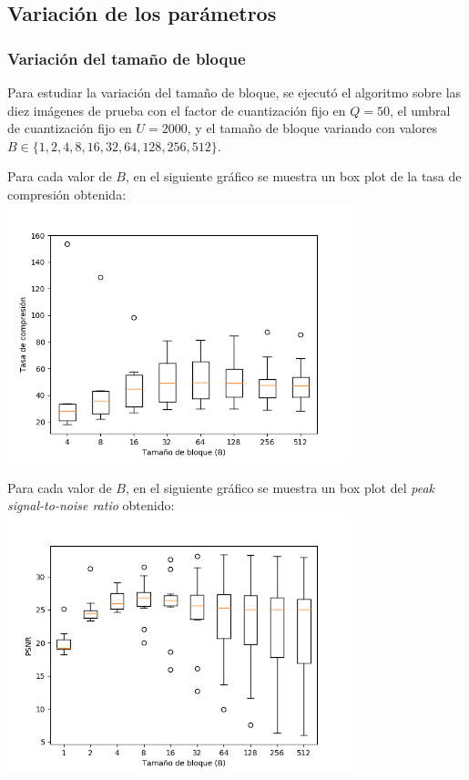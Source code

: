 \documentclass{article}
\newcommand{\set}[1]{\{#1\}}
\begin{document}
\newpage
\subsection{Variación de los parámetros}

\subsubsection{Variación del tamaño de bloque}

Para estudiar la variación del tamaño de bloque, se ejecutó el
algoritmo sobre las diez imágenes de prueba con el
factor de cuantización fijo en $Q = 50$,
el umbral de cuantización fijo en $U = 2000$,
y el tamaño de bloque variando con valores
$B \in \set{1,2,4,8,16,32,64,128,256,512}$.

Para cada valor de $B$, en el siguiente gráfico se muestra un
box plot de la tasa de compresión obtenida:\\
\includegraphics[width=10cm]{../imgs/output/gray_plots/b_rate.png}

Para cada valor de $B$, en el siguiente gráfico se muestra un
box plot del {\em peak signal-to-noise ratio} obtenido:\\
\includegraphics[width=10cm]{../imgs/output/gray_plots/b_psnr.png}
\end{document}
